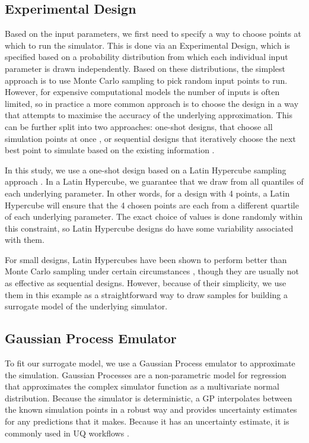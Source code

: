 \documentclass[openacc]{rstransa}%
\begin{document}
\subsection{Experimental Design}

\label{experimentaldesign}

Based on the input parameters, we first need to specify a way to choose points at which to run the simulator.
This is done via an Experimental Design, which is specified based on a probability distribution from which
each individual input parameter is drawn independently. Based on these distributions, the simplest approach
is to use Monte Carlo sampling to pick random input points to run. However, for expensive computational
models the number of inputs is often limited, so in practice a more common approach is to choose
the design in a way that attempts to maximise the accuracy of the underlying approximation. This can be
further split into two approaches: one-shot designs, that choose all simulation points at once \cite{lhc},
or sequential designs that iteratively choose the next best point to simulate based on the existing
information \cite{mice}.

In this study, we use a one-shot design based on a Latin Hypercube sampling approach \cite{lhc}. In a Latin
Hypercube, we guarantee that we draw from all quantiles of each underlying parameter. In other words,
for a design with 4 points, a Latin Hypercube will ensure that the 4 chosen points are each from
a different quartile of each underlying parameter. The exact choice of values is done randomly
within this constraint, so Latin Hypercube designs do have some variability associated with them.

For small designs, Latin Hypercubes have been shown to perform better than Monte Carlo sampling under
certain circumstances \cite{lhc}, though they are usually not as effective as sequential designs. However, because
of their simplicity, we use them in this example as a straightforward way to draw samples for
building a surrogate model of the underlying simulator.

\subsection{Gaussian Process Emulator}

To fit our surrogate model, we use a Gaussian Process emulator to approximate the simulation.
Gaussian Processes are a non-parametric model for regression that approximates the complex simulator
function as a multivariate normal distribution. Because the simulator is deterministic,
a GP interpolates between the known simulation points in a robust way and provides uncertainty
estimates for any predictions that it makes. Because it has an uncertainty estimate, it is commonly
used in UQ workflows \cite{calibration,histmatch,mice}.
\end{document}
